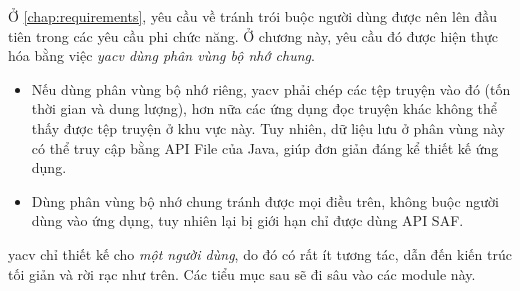 \documentclass[../../thesis]{subfiles}
\begin{document}
Ở \autoref{chap:requirements}, yêu cầu về tránh trói buộc người dùng được nên
lên đầu tiên trong các yêu cầu phi chức năng. Ở chương này, yêu cầu đó được hiện
thực hóa bằng việc \emph{yacv dùng phân vùng bộ nhớ chung}.

\begin{itemize}
    \item
        Nếu dùng phân vùng bộ nhớ riêng, yacv phải chép các tệp truyện vào đó
        (tốn thời gian và dung lượng), hơn nữa các ứng dụng đọc truyện khác
        không thể thấy được tệp truyện ở khu vực này. Tuy nhiên, dữ liệu lưu ở
        phân vùng này có thể truy cập bằng API File của Java, giúp đơn giản đáng
        kể thiết kế ứng dụng.
    \item
        Dùng phân vùng bộ nhớ chung tránh được mọi điều trên, không buộc người
        dùng vào ứng dụng, tuy nhiên lại bị giới hạn chỉ được dùng API SAF.
\end{itemize}

yacv chỉ thiết kế cho \emph{một người dùng}, do đó có rất ít tương tác, dẫn đến
kiến trúc tối giản và rời rạc như trên. Các tiểu mục sau sẽ đi sâu vào các
module này.
















\end{document}
